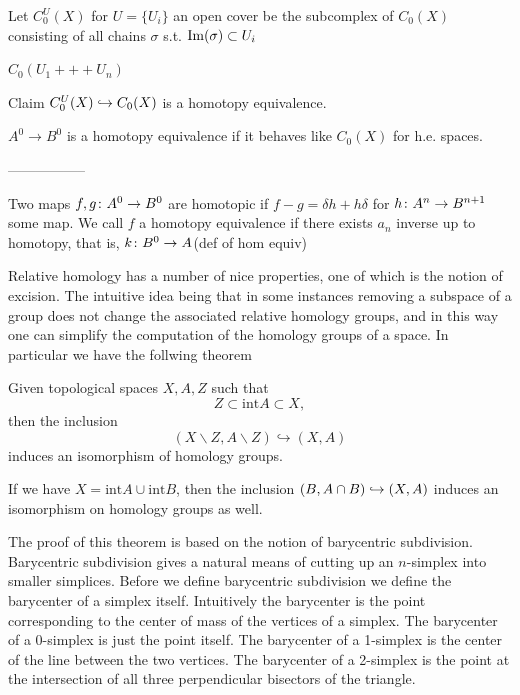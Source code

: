 \documentclass[11pt,leqno,oneside]{amsart}
\newenvironment{dateenv}{
  \vspace{1em}
}{
  \vspace{1em}
}
\newcommand{\mydate}[4]{
  \newdate{#1}{#2}{#3}{#4}
  \begin{dateenv}
    \hfill\displaydate{#1}
  \end{dateenv}
}
\numberwithin{thm}{section}
\renewcommand{\setminus}{\smallsetminus}
\begin{document}
Let $C^U_0(X)$ for $U = \{U_i\}$ an open cover be the subcomplex of $C_0(X)$ consisting of all chains $\sigma$ s.t. $\operatorname{Im}(\sigma) \subset U_i$

$C_0(U_1 +++ U_n)$

Claim $C^U_0(X) \hookrightarrow C_0(X)$ is a homotopy equivalence.

$A^0 \to B^0$ is a homotopy equivalence if it behaves like $C_0(X)$ for h.e. spaces.

-----------------

Two maps $f,g \colon A^0 \to B^0$ are homotopic if $f - g = \delta h + h \delta$ for $h \colon A^n \to B^{n+1}$ some map.  We call $f$ a homotopy equivalence if there exists $a_n$ inverse up to homotopy, that is, $k \colon B^0 \to A$(def of hom equiv)




\mydate{d21}{22}{3}{2017}

Relative homology has a number of nice properties, one of which is the notion of excision. The intuitive idea being that in some instances removing a subspace of a group does not change the associated relative homology groups, and in this way one can simplify the computation of the homology groups of a space. In particular we have the follwing theorem

\begin{thm}[Excision]

  Given topological spaces \(X,A,Z\) such that
  \[Z \subset \text{int}{A} \subset X,\]
  then the inclusion
  \[(X \setminus Z,A \setminus Z) \hookrightarrow (X,A) \]
  induces an isomorphism of homology groups.
\end{thm}

If we have \(X=\text{int} A \cup \text{int} B\), then the inclusion \((B, A \cap B) \hookrightarrow (X,A)\) induces an isomorphism on homology groups as well.

The proof of this theorem is based on the notion of barycentric subdivision. Barycentric subdivision gives a natural means of cutting up an \(n\)-simplex into smaller simplices. Before we define barycentric subdivision we define the barycenter of a simplex itself. Intuitively the barycenter is the point corresponding to the center of mass of the vertices of a simplex. The barycenter of a 0-simplex is just the point itself. The barycenter of a 1-simplex is the center of the line between the two vertices. The barycenter of a 2-simplex is the point at the intersection of all three perpendicular bisectors of the triangle.

\mydate{d22}{24}{3}{2017}
\end{document}
